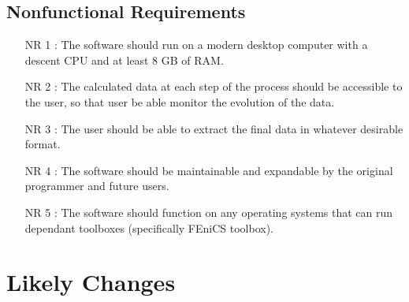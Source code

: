 \documentclass[12pt]{article}
\begin{document}
\subsection{Nonfunctional Requirements}

\begin{itemize}
		\item[NR 1 \label{NR_RAM}:] The software should run on a modern desktop computer with a descent CPU and at least 8 GB of RAM.
		
		\item[NR 2 \label{NR_data}:] The calculated data at each step of the process should be accessible to the user, so that user be able monitor the evolution of the data.
		
		\item[NR 3 \label{NR_Output}:] The user should be able to extract the final data in whatever desirable format. 
		
		\item[NR 4 \label{R_update}:] The software should be maintainable and expandable by the original programmer and future users.
		
		\item[NR 5 \label{R_compatibility}:] The software should function on any operating systems that can run dependant toolboxes (specifically FEniCS toolbox). 
\end{itemize}


\section{Likely Changes}    
\end{document}

